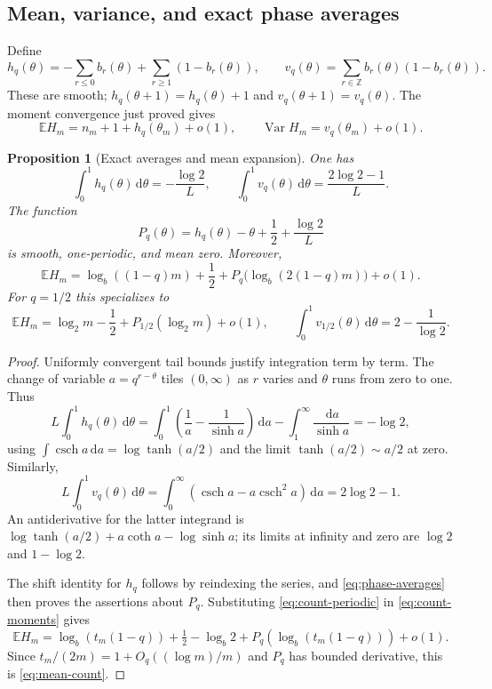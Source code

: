 \documentclass[11pt,a4paper]{article}
\numberwithin{equation}{section}
\newtheorem{proposition}[theorem]{Proposition}
\theoremstyle{definition}
\theoremstyle{remark}
\newcommand{\E}{\mathbb E}
\newcommand{\Z}{\mathbb Z}
\newcommand{\Var}{\operatorname{Var}}
\newcommand{\csch}{\operatorname{csch}}
\newcommand{\dd}{\,\mathrm d}
\begin{document}
\subsection{Mean, variance, and exact phase averages}
Define
\begin{equation}
h_q(\theta)=-\sum_{r\le0}b_r(\theta)
 +\sum_{r\ge1}(1-b_r(\theta)),\qquad
v_q(\theta)=\sum_{r\in\Z}b_r(\theta)(1-b_r(\theta)).
\label{eq:count-functions}
\end{equation}
These are smooth; $h_q(\theta+1)=h_q(\theta)+1$ and
$v_q(\theta+1)=v_q(\theta)$. The moment convergence just proved gives
\begin{equation}
\E H_m=n_m+1+h_q(\theta_m)+o(1),\qquad
\Var H_m=v_q(\theta_m)+o(1).
\label{eq:count-moments}
\end{equation}

\begin{proposition}[Exact averages and mean expansion]
\label{prop:phase-averages}
One has
\begin{equation}
\int_0^1h_q(\theta)\dd\theta=-\frac{\log2}{L},\qquad
\int_0^1v_q(\theta)\dd\theta=\frac{2\log2-1}{L}.
\label{eq:phase-averages}
\end{equation}
The function
\begin{equation}
P_q(\theta)=h_q(\theta)-\theta+\frac12+\frac{\log2}{L}
\label{eq:count-periodic}
\end{equation}
is smooth, one-periodic, and mean zero. Moreover,
\begin{equation}
\E H_m=\log_b((1-q)m)+\frac12
 +P_q\bigl(\log_b(2(1-q)m)\bigr)+o(1).
\label{eq:mean-count}
\end{equation}
For $q=1/2$ this specializes to
\begin{equation}
\E H_m=\log_2m-\frac12+P_{1/2}(\log_2m)+o(1),\qquad
\int_0^1v_{1/2}(\theta)\dd\theta=2-\frac1{\log2}.
\label{eq:dyadic-count}
\end{equation}
\end{proposition}
\begin{proof}
Uniformly convergent tail bounds justify integration term by term.
The change of variable $a=q^{r-\theta}$ tiles $(0,\infty)$ as $r$
varies and $\theta$ runs from zero to one. Thus
\[
L\int_0^1h_q(\theta)\dd\theta
=\int_0^1\left(\frac1a-\frac1{\sinh a}\right)\dd a
 -\int_1^\infty\frac{\dd a}{\sinh a}=-\log2,
\]
using $\int\csch a\dd a=\log\tanh(a/2)$ and the limit
$\tanh(a/2)\sim a/2$ at zero. Similarly,
\[
L\int_0^1v_q(\theta)\dd\theta
=\int_0^\infty\left(\csch a-a\csch^2a\right)\dd a
=2\log2-1.
\]
An antiderivative for the latter integrand is
$\log\tanh(a/2)+a\coth a-\log\sinh a$; its limits at infinity
and zero are $\log2$ and $1-\log2$.

The shift identity for $h_q$ follows by reindexing the series, and
\cref{eq:phase-averages} then proves the assertions about $P_q$.
Substituting \cref{eq:count-periodic} in \cref{eq:count-moments}
gives
\[
\E H_m=\log_b(t_m(1-q))+\tfrac12-\log_b2
 +P_q(\log_b(t_m(1-q)))+o(1).
\]
Since $t_m/(2m)=1+O_q((\log m)/m)$ and $P_q$ has bounded derivative,
this is \cref{eq:mean-count}.
\end{proof}
\end{document}
